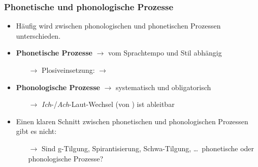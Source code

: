 \begin{frame}%
\frametitle{Phonetische und phonologische Prozesse}

\begin{itemize}
	\item Häufig wird zwischen phonologischen und phonetischen Prozessen unterschieden.
	\item[]
	
	\item \textbf{Phonetische Prozesse} $\rightarrow$ vom Sprachtempo und Stil abhängig
	\begin{itemize}
	\item[$\rightarrow$] Plosiveinsetzung:  $\rightarrow$ \textipa{[Pampt]}
	\end{itemize}

	\item \textbf{Phonologische Prozesse} $\rightarrow$ systematisch und obligatorisch
	\begin{itemize}
		\item[$\rightarrow$] \textit{Ich}-/\textit{Ach}-Laut-Wechsel \textipa{[bu:x]} (von ) ist ableitbar
	\end{itemize}

	\item Einen klaren Schnitt zwischen phonetischen und phonologischen Prozessen gibt es nicht:
	\begin{itemize}
		\item[$\rightarrow$] Sind g-Tilgung, Spirantisierung, Schwa-Tilgung, \dots\ phonetische oder phonologische Prozesse?
	\end{itemize}

\end{itemize}

\end{frame}




